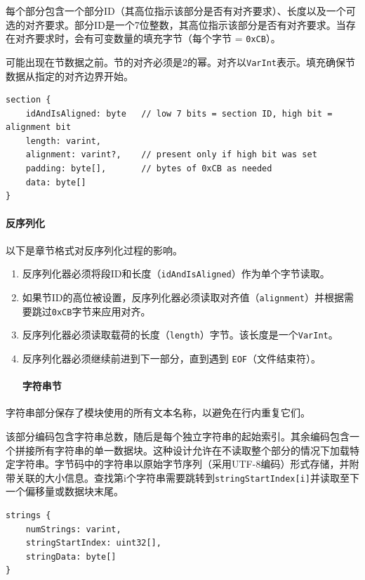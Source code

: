\documentclass{article}
\begin{document}
每个部分包含一个部分ID（其高位指示该部分是否有对齐要求）、长度以及一个可选的对齐要求。部分ID是一个7位整数，其高位指示该部分是否有对齐要求。当存在对齐要求时，会有可变数量的填充字节（每个字节 = \texttt{0xCB}）。

可能出现在节数据之前。节的对齐必须是2的幂。对齐以\texttt{VarInt}表示。填充确保节数据从指定的对齐边界开始。


\begin{lstlisting}
section {
    idAndIsAligned: byte   // low 7 bits = section ID, high bit = alignment bit
    length: varint,
    alignment: varint?,    // present only if high bit was set
    padding: byte[],       // bytes of 0xCB as needed
    data: byte[]
}
\end{lstlisting}

\paragraph{反序列化}

以下是章节格式对反序列化过程的影响。


\begin{enumerate}
\item 反序列化器必须将段ID和长度（\texttt{idAndIsAligned}）作为单个字节读取。
\item 如果节ID的高位被设置，反序列化器必须读取对齐值（\texttt{alignment}）并根据需要跳过\texttt{0xCB}字节来应用对齐。
\item 反序列化器必须读取载荷的长度（\texttt{length}）字节。该长度是一个\texttt{VarInt}。
\item 反序列化器必须继续前进到下一部分，直到遇到 \texttt{EOF}（文件结束符）。


\paragraph{字符串节}

\end{enumerate}
字符串部分保存了模块使用的所有文本名称，以避免在行内重复它们。

该部分编码包含字符串总数，随后是每个独立字符串的起始索引。其余编码包含一个拼接所有字符串的单一数据块。这种设计允许在不读取整个部分的情况下加载特定字符串。字节码中的字符串以原始字节序列（采用UTF-8编码）形式存储，并附带关联的大小信息。查找第i个字符串需要跳转到\texttt{stringStartIndex[i]}并读取至下一个偏移量或数据块末尾。


\begin{lstlisting}
strings {
    numStrings: varint,
    stringStartIndex: uint32[],
    stringData: byte[]
}
\end{lstlisting}
\end{document}
